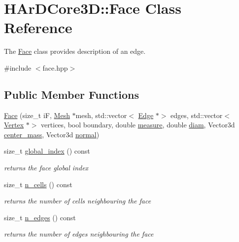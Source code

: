 \hypertarget{classHArDCore3D_1_1Face}{}\section{H\+Ar\+D\+Core3D\+:\+:Face Class Reference}
\label{classHArDCore3D_1_1Face}


The \hyperlink{classHArDCore3D_1_1Face}{Face} class provides description of an edge.  




{\ttfamily \#include $<$face.\+hpp$>$}

\subsection*{Public Member Functions}
\begin{DoxyCompactItemize}
\item 
\hyperlink{classHArDCore3D_1_1Face_a7dc8f1b50f054d1612862e0ccffe0827}{Face} (size\+\_\+t iF, \hyperlink{classHArDCore3D_1_1Mesh}{Mesh} $\ast$mesh, std\+::vector$<$ \hyperlink{classHArDCore3D_1_1Edge}{Edge} $\ast$$>$ edges, std\+::vector$<$ \hyperlink{classHArDCore3D_1_1Vertex}{Vertex} $\ast$$>$ vertices, bool boundary, double \hyperlink{group__Mesh_gad8284631ae078f8f5a15147b7b1014a1}{measure}, double \hyperlink{group__Mesh_ga3303318a9f1465bf279617959644b01a}{diam}, Vector3d \hyperlink{classHArDCore3D_1_1Face_ac5d883f4f09a9af506924638939bb35a}{center\+\_\+mass}, Vector3d \hyperlink{classHArDCore3D_1_1Face_af2b13fd21cb283d14878c2ea25727e1f}{normal})
\item 
size\+\_\+t \hyperlink{group__Mesh_ga5cf9000fd94ae2e7ec79245607644f1b}{global\+\_\+index} () const
\begin{DoxyCompactList}\small\item\em returns the face global index \end{DoxyCompactList}\item 
size\+\_\+t \hyperlink{group__Mesh_ga5407c36b8a6d8d8bf64e8fd559cebbe9}{n\+\_\+cells} () const
\begin{DoxyCompactList}\small\item\em returns the number of cells neighbouring the face \end{DoxyCompactList}\item 
size\+\_\+t \hyperlink{group__Mesh_gaab27135cdfd18bc7dae7f01715a4edc6}{n\+\_\+edges} () const
\begin{DoxyCompactList}\small\item\em returns the number of edges neighbouring the face \end{DoxyCompactList}\item 

\end{DoxyCompactItemize}
